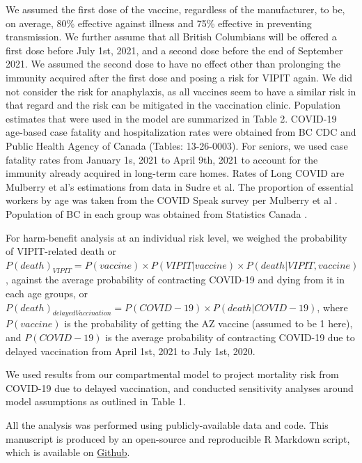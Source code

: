\documentclass[]{interact}
\theoremstyle{plain}%
\theoremstyle{definition}
\theoremstyle{remark}
\begin{document}
We assumed the first dose of the vaccine, regardless of the
manufacturer, to be, on average, 80\% effective against illness and 75\%
effective in preventing transmission. We further assume that all British
Columbians will be offered a first dose before July 1st, 2021, and a
second dose before the end of September 2021. We assumed the second dose
to have no effect other than prolonging the immunity acquired after the
first dose and posing a risk for VIPIT again. We did not consider the
risk for anaphylaxis, as all vaccines seem to have a similar risk in
that regard and the risk can be mitigated in the vaccination clinic.
Population estimates that were used in the model are summarized in Table
2. COVID-19 age-based case fatality and hospitalization rates were
obtained from BC CDC \citep{bccdc_british_2021} and Public Health Agency
of Canada (Tables:
13-26-0003)\citep{statistics_canada_preliminary_2021}. For seniors, we
used case fatality rates from January 1s, 2021 to April 9th, 2021 to
account for the immunity already acquired in long-term care homes. Rates
of Long COVID are Mulberry et al's estimations from data in Sudre et
al\citep{sudre_attributes_2021}. The proportion of essential workers by
age was taken from the COVID Speak survey per Mulberry et al
\citep{mulberry_vaccine_2021}. Population of BC in each group was
obtained from Statistics Canada \citep{statistics_canada_census_2017}.

For harm-benefit analysis at an individual risk level, we weighed the
probability of VIPIT-related death or
\(P(death)_{VIPIT} = P(vaccine) \times P(VIPIT|vaccine) \times P(death|VIPIT, vaccine)\),
against the average probability of contracting COVID-19 and dying from
it in each age groups, or
\(P(death)_{delayedVaccination} = P(COVID-19) \times P(death|COVID-19)\),
where \(P(vaccine)\) is the probability of getting the AZ vaccine
(assumed to be 1 here), and \(P(COVID-19)\) is the average probability
of contracting COVID-19 due to delayed vaccination from April 1st, 2021
to July 1st, 2020.

We used results from our compartmental model to project mortality risk
from COVID-19 due to delayed vaccination, and conducted sensitivity
analyses around model assumptions as outlined in Table 1.

All the analysis was performed using publicly-available data and code.
This manuscript is produced by an open-source and reproducible R
Markdown script, which is available on
\href{https://github.com/aminadibi/astrazenecaVIPIT}{Github}.
\end{document}
